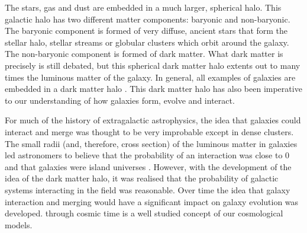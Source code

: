 The stars, gas and dust are embedded in a much larger, spherical halo. This galactic halo has two different matter components: baryonic and non-baryonic. The baryonic component is formed of very diffuse, ancient stars that form the stellar halo, stellar streams or globular clusters which orbit around the galaxy. The non-baryonic component is formed of dark matter. What dark matter is precisely is still debated, but this spherical dark matter halo extents out to many times the luminous matter of the galaxy. In general, all examples of galaxies are embedded in a dark matter halo \cite[although there are some debated exceptions as described in][]{2018Natur.555..629V}. This dark matter halo has also been imperative to our understanding of how galaxies form, evolve and interact.

For much of the history of extragalactic astrophysics, the idea that galaxies could interact and merge was thought to be very improbable except in dense clusters. The small radii (and, therefore, cross section) of the luminous matter in galaxies led astronomers to believe that the probability of an interaction was close to 0 and that galaxies were island universes \DIFdelbegin {}\DIFdelend \DIFaddbegin {}\DIFaddend . However, with the development of the idea of the dark matter halo, it was realised that the probability of galactic systems interacting in the field was reasonable. Over time the idea that galaxy interaction and merging would have a significant impact on galaxy evolution was developed. \DIFdelbegin {}\DIFdelend \DIFaddbegin {}\DIFaddend through cosmic time is a well studied concept \DIFaddbegin {}\DIFaddend of our cosmological models\DIFdelbegin {}\DIFdelend .

